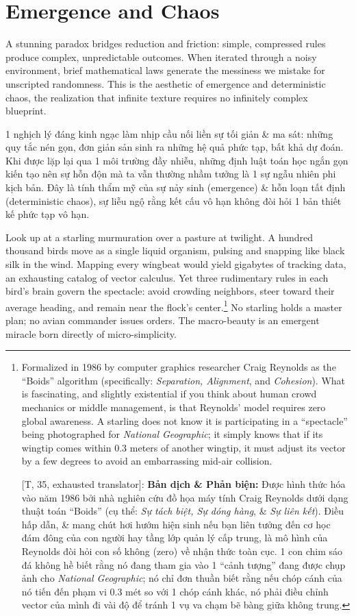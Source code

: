 \documentclass[11pt]{article}
\begin{document}
\section{Emergence and Chaos}
A stunning paradox bridges reduction and friction: simple, compressed rules produce complex, unpredictable outcomes. When iterated through a noisy environment, brief mathematical laws generate the messiness we mistake for unscripted randomness. This is the aesthetic of emergence and deterministic chaos, the realization that infinite texture requires no infinitely complex blueprint.

1 nghịch lý đáng kinh ngạc làm nhịp cầu nối liền sự tối giản \& ma sát: những quy tắc nén gọn, đơn giản sản sinh ra những hệ quả phức tạp, bất khả dự đoán. Khi được lặp lại qua 1 môi trường đầy nhiễu, những định luật toán học ngắn gọn kiến tạo nên sự hỗn độn mà ta vẫn thường nhầm tưởng là 1 sự ngẫu nhiên phi kịch bản. Đây là tính thẩm mỹ của sự nảy sinh (emergence) \& hỗn loạn tất định (deterministic chaos), sự liễu ngộ rằng kết cấu vô hạn không đòi hỏi 1 bản thiết kế phức tạp vô hạn.

Look up at a starling murmuration over a pasture at twilight. A hundred thousand birds move as a single liquid organism, pulsing and snapping like black silk in the wind. Mapping every wingbeat would yield gigabytes of tracking data, an exhausting catalog of vector calculus. Yet three rudimentary rules in each bird's brain govern the spectacle: avoid crowding neighbors, steer toward their average heading, and remain near the flock's center.\footnote{Formalized in 1986 by computer graphics researcher Craig Reynolds as the ``Boids'' algorithm (specifically: \textit{Separation, Alignment}, and \textit{Cohesion}). What is fascinating, and slightly existential if you think about human crowd mechanics or middle management, is that Reynolds' model requires zero global awareness. A starling does not know it is participating in a ``spectacle'' being photographed for \textit{National Geographic}; it simply knows that if its wingtip comes within 0.3 meters of another wingtip, it must adjust its vector by a few degrees to avoid an embarrassing mid-air collision.
	
	\textsf{[T, 35, exhausted translator]:} \textbf{Bản dịch \& Phản biện:} Được hình thức hóa vào năm 1986 bởi nhà nghiên cứu đồ họa máy tính Craig Reynolds dưới dạng thuật toán ``Boids'' (cụ thể: \textit{Sự tách biệt, Sự dóng hàng}, \& \textit{Sự liên kết}). Điều hấp dẫn, \& mang chút hơi hướm hiện sinh nếu bạn liên tưởng đến cơ học đám đông của con người hay tầng lớp quản lý cấp trung, là mô hình của Reynolds đòi hỏi con số không (zero) về nhận thức toàn cục. 1 con chim sáo đá không hề biết rằng nó đang tham gia vào 1 ``cảnh tượng'' đang được chụp ảnh cho \textit{National Geographic}; nó chỉ đơn thuần biết rằng nếu chóp cánh của nó tiến đến phạm vi 0.3 mét so với 1 chóp cánh khác, nó phải điều chỉnh vector của mình đi vài độ để tránh 1 vụ va chạm bẽ bàng giữa không trung.} No starling holds a master plan; no avian commander issues orders. The macro-beauty is an emergent miracle born directly of micro-simplicity.
\end{document}
